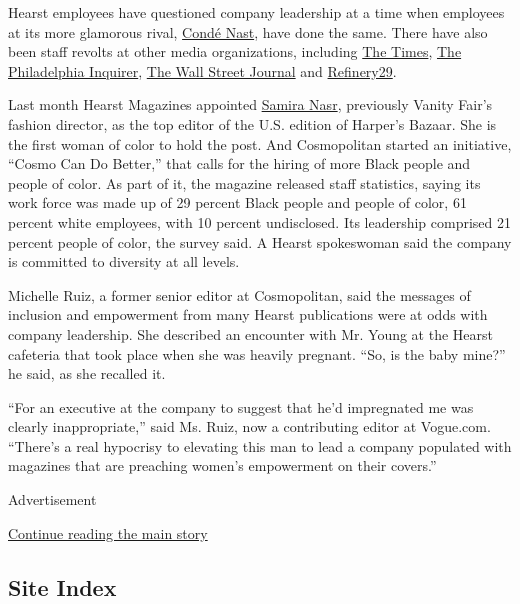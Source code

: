 Hearst employees have questioned company leadership at a time when
employees at its more glamorous rival,
\href{https://www.nytimes.com/2020/06/13/business/media/conde-nast-racial.html}{Condé
Nast}, have done the same. There have also been staff revolts at other
media organizations, including
\href{https://www.nytimes.com/2020/06/07/business/media/james-bennet-resigns-nytimes-op-ed.html}{The
Times},
\href{https://www.nytimes.com/2020/06/06/business/media/editor-philadephia-inquirer-resigns.html}{The
Philadelphia Inquirer},
\href{https://www.nytimes.com/2020/07/10/business/media/wall-street-journal-staff.html}{The
Wall Street Journal} and
\href{https://www.nytimes.com/2020/06/08/business/media/refinery-29-christene-barberich.html}{Refinery29}.

Last month Hearst Magazines appointed
\href{https://www.nytimes.com/2020/06/09/business/media/harpers-bazaar-editor-samira-nasr.html}{Samira
Nasr}, previously Vanity Fair's fashion director, as the top editor of
the U.S. edition of Harper's Bazaar. She is the first woman of color to
hold the post. And Cosmopolitan started an initiative, ``Cosmo Can Do
Better,'' that calls for the hiring of more Black people and people of
color. As part of it, the magazine released staff statistics, saying its
work force was made up of 29 percent Black people and people of color,
61 percent white employees, with 10 percent undisclosed. Its leadership
comprised 21 percent people of color, the survey said. A Hearst
spokeswoman said the company is committed to diversity at all levels.

Michelle Ruiz, a former senior editor at Cosmopolitan, said the messages
of inclusion and empowerment from many Hearst publications were at odds
with company leadership. She described an encounter with Mr. Young at
the Hearst cafeteria that took place when she was heavily pregnant.
``So, is the baby mine?'' he said, as she recalled it.

``For an executive at the company to suggest that he'd impregnated me
was clearly inappropriate,'' said Ms. Ruiz, now a contributing editor at
Vogue.com. ``There's a real hypocrisy to elevating this man to lead a
company populated with magazines that are preaching women's empowerment
on their covers.''

Advertisement

\protect\hyperlink{after-bottom}{Continue reading the main story}

\hypertarget{site-index}{%
\subsection{Site Index}\label{site-index}}

